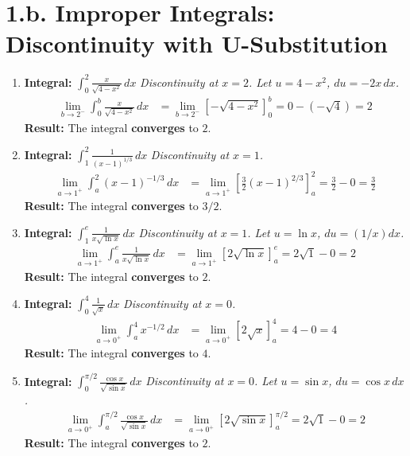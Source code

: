 \documentclass[12pt]{article}
\newcommand{\problemsettitle}[1]{\section*{#1}}
\begin{document}
\newpage
\problemsettitle{1.b. Improper Integrals: Discontinuity with U-Substitution}
\begin{enumerate}
    \item \textbf{Integral: } $\displaystyle \int_{0}^{2} \frac{x}{\sqrt{4-x^2}} \,dx$
    \textit{Discontinuity at $x=2$. Let $u=4-x^2$, $du=-2x\,dx$.}
    \begin{align*}
        \lim_{b \to 2^-} \int_{0}^{b} \frac{x}{\sqrt{4-x^2}} \,dx &= \lim_{b \to 2^-} [-\sqrt{4-x^2}]_0^b = 0 - (-\sqrt{4}) = 2
    \end{align*}
    \textbf{Result:} The integral \textbf{converges} to $2$.

    \item \textbf{Integral: } $\displaystyle \int_{1}^{2} \frac{1}{(x-1)^{1/3}} \,dx$
    \textit{Discontinuity at $x=1$.}
    \begin{align*}
        \lim_{a \to 1^+} \int_{a}^{2} (x-1)^{-1/3} \,dx &= \lim_{a \to 1^+} \left[\frac{3}{2}(x-1)^{2/3}\right]_a^2 = \frac{3}{2} - 0 = \frac{3}{2}
    \end{align*}
    \textbf{Result:} The integral \textbf{converges} to $3/2$.

    \item \textbf{Integral: } $\displaystyle \int_{1}^{e} \frac{1}{x\sqrt{\ln x}} \,dx$
    \textit{Discontinuity at $x=1$. Let $u=\ln x$, $du = (1/x)dx$.}
    \begin{align*}
        \lim_{a \to 1^+} \int_{a}^{e} \frac{1}{x\sqrt{\ln x}} \,dx &= \lim_{a \to 1^+} [2\sqrt{\ln x}]_a^e = 2\sqrt{1} - 0 = 2
    \end{align*}
    \textbf{Result:} The integral \textbf{converges} to $2$.

    \item \textbf{Integral: } $\displaystyle \int_{0}^{4} \frac{1}{\sqrt{x}} \,dx$
    \textit{Discontinuity at $x=0$.}
    \begin{align*}
        \lim_{a \to 0^+} \int_{a}^{4} x^{-1/2} \,dx &= \lim_{a \to 0^+} [2\sqrt{x}]_a^4 = 4 - 0 = 4
    \end{align*}
    \textbf{Result:} The integral \textbf{converges} to $4$.

    \item \textbf{Integral: } $\displaystyle \int_{0}^{\pi/2} \frac{\cos x}{\sqrt{\sin x}} \,dx$
    \textit{Discontinuity at $x=0$. Let $u=\sin x$, $du=\cos x \,dx$.}
    \begin{align*}
        \lim_{a \to 0^+} \int_{a}^{\pi/2} \frac{\cos x}{\sqrt{\sin x}} \,dx &= \lim_{a \to 0^+} [2\sqrt{\sin x}]_a^{\pi/2} = 2\sqrt{1} - 0 = 2
    \end{align*}
    \textbf{Result:} The integral \textbf{converges} to $2$.


\end{enumerate}
\end{document}
